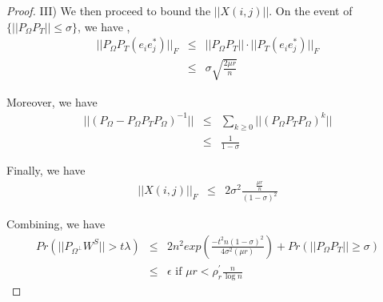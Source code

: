 \documentclass{../common/projectreport}
\begin{document}
\begin{proof}
III) We then proceed to bound the $||X(i,j)||$. On the event of $\{||P_{\Omega}P_{T}||\le\sigma\}$,
we have , 
\begin{eqnarray*}
||P_{\Omega}P_{T}(e_{i}e_{j}^{*})||_{F} & \le & ||P_{\Omega}P_{T}||\cdot||P_{T}(e_{i}e_{j}^{*})||_{F}\\
 & \le & \sigma\sqrt{\frac{2\mu r}{n}}
\end{eqnarray*}


Moreover, we have 
\begin{eqnarray*}
||(P_{\Omega}-P_{\Omega}P_{T}P_{\Omega})^{-1}|| & \le & \sum_{k\ge0}||(P_{\Omega}P_{T}P_{\Omega})^{k}||\\
 & \le & \frac{1}{1-\sigma}
\end{eqnarray*}


Finally, we have 
\begin{eqnarray*}
||X(i,j)||_{F} & \le & 2\sigma^{2}\frac{\frac{\mu r}{n}}{(1-\sigma)^{2}}
\end{eqnarray*}


Combining, we have 
\begin{eqnarray*}
Pr(||P_{\Omega^{\bot}}W^{S}||>t\lambda) & \le & 2n^{2}exp(\frac{-t^{2}n(1-\sigma)^{2}}{4\sigma^{2}(\mu r)})+Pr(||P_{\Omega}P_{T}||\ge\sigma)\\
 & \le & \epsilon\text{ if }\mu r<\rho_{r}^{'}\frac{n}{\log n}
\end{eqnarray*}

\end{proof}

\end{document}
